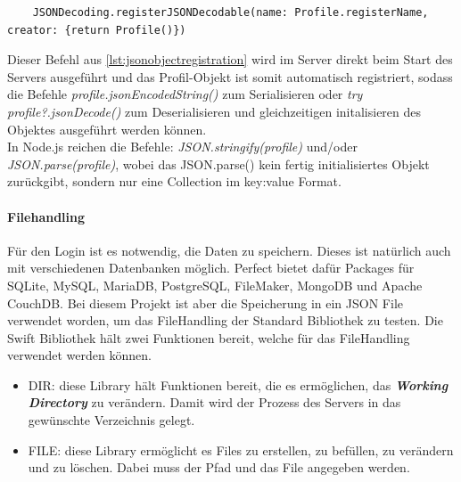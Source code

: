 
\begin{lstlisting}
	JSONDecoding.registerJSONDecodable(name: Profile.registerName, creator: {return Profile()})
\end{lstlisting}

Dieser Befehl aus \ref{lst:jsonobjectregistration} wird im Server direkt beim Start des Servers ausgeführt und das Profil-Objekt ist somit automatisch registriert, sodass die Befehle \textit{profile.jsonEncodedString()} zum Serialisieren oder \textit{try profile?.jsonDecode()} zum Deserialisieren und gleichzeitigen initalisieren des Objektes ausgeführt werden können. 
\\
In Node.js reichen die Befehle: \textit{JSON.stringify(profile)} und/oder \textit{JSON.parse(profile)}, wobei das JSON.parse() kein fertig initialisiertes Objekt zurückgibt, sondern nur eine Collection im key:value Format.

\paragraph{Filehandling}
Für den Login ist es notwendig, die Daten zu speichern. Dieses ist natürlich auch mit verschiedenen Datenbanken möglich. Perfect bietet dafür Packages für SQLite, MySQL, MariaDB, PostgreSQL, FileMaker, MongoDB und Apache CouchDB. Bei diesem Projekt ist aber die Speicherung in ein JSON File verwendet worden, um das FileHandling der Standard Bibliothek zu testen. Die Swift Bibliothek hält zwei Funktionen bereit, welche für das FileHandling verwendet werden können. 
\begin{itemize}
\item DIR: diese Library hält Funktionen bereit, die es ermöglichen, das \textit{\textbf{Working Directory}} zu verändern. Damit wird der Prozess des Servers in das gewünschte Verzeichnis gelegt.
\item FILE: diese Library ermöglicht es Files zu erstellen, zu befüllen, zu verändern und zu löschen. Dabei muss der Pfad und das File angegeben werden. 
\end{itemize}


